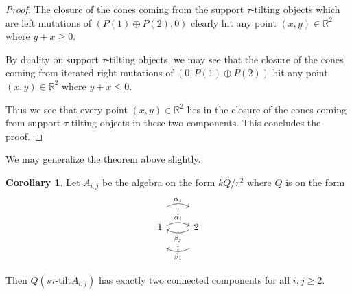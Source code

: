 \documentclass[]{article}
\theoremstyle{definition}
\newtheorem{corollary}{Corollary}[section]
\newcommand{\tu}{\ensuremath{\tau}}
\begin{document}
\begin{proof}
	The closure of the cones coming from the support \tu-tilting objects which are left mutations of $(P(1) \oplus P(2),0)$ clearly hit any point $(x,y) \in \mathbb{R}^2$ where $y + x \geq 0$. 
	
	By duality on support $\tu$-tilting objects, we may see that the closure of the cones coming from iterated right mutations of $(0,P(1)\oplus P(2))$ hit any point $(x,y) \in \mathbb{R}^2$ where $y + x \leq 0$. 
	
	Thus we see that every point $(x,y) \in \mathbb{R}^2$ lies in the closure of the cones coming from support \tu-tilting objects in these two components. This concludes the proof.
	
	
\end{proof}

We may generalize the theorem above slightly.
\begin{corollary}
	Let $A_{i,j}$ be the algebra on the form $kQ/r^2$ where $Q$ is on the form
	\[\begin{tikzcd}
	1
	\arrow[r, shift right = -3.5ex, draw=none, "\raisebox{+2.5ex}{\vdots}" description]
	\arrow[r,bend left,shift right = 0.5ex, "\alpha_i"]
	\arrow[r,bend left, shift left = 4ex, "\alpha_1"]
	& 2 \arrow[l, shift left = 5.0ex, draw=none, "\raisebox{+2.5ex}{\vdots}" description]
	\arrow[l,bend left,shift right = 0.5ex,"\beta_j"]
	\arrow[l,bend left,shift left = 4.0ex, "\beta_1"]  \\
	\end{tikzcd}
	\]
	
	Then $Q(s\tu\text{-tilt} A_{i,j})$ has exactly two connected components for all $i,j \geq 2$.
	
\end{corollary}
\end{document}
